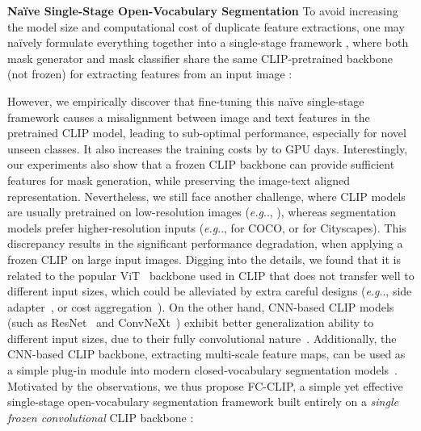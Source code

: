 \documentclass{article}
\makeatletter
\DeclareRobustCommand\onedot{\futurelet\@let@token\@onedot}
\def\@onedot{\ifx\@let@token.\else.\null\fi\xspace}
\def\eg{\emph{e.g}\onedot}
\newcommand{\modelname}{FC-CLIP\xspace}
\makeatother
\begin{document}
\noindent \textbf{Na\"ive Single-Stage Open-Vocabulary Segmentation}\quad
To avoid increasing the model size and computational cost of duplicate feature extractions, one may na\"ively formulate everything together into a single-stage framework , where both mask generator and mask classifier share the same CLIP-pretrained backbone  (not frozen) for extracting features from an input image :


However, we empirically discover that fine-tuning this na\"ive single-stage framework causes a misalignment between image and text features in the pretrained CLIP model, leading to sub-optimal performance, especially for novel unseen classes. It also increases the training costs by  to  GPU days.
Interestingly, our experiments also show that a frozen CLIP backbone can provide sufficient features for mask generation, while preserving the image-text aligned representation.
Nevertheless, we still face another challenge, where CLIP models are usually pretrained on low-resolution images (\eg, ), whereas segmentation models prefer higher-resolution inputs (\eg,  for COCO, or  for Cityscapes).
This discrepancy results in the significant performance degradation, when applying a frozen CLIP on large input images.
Digging into the details, we found that it is related to the popular ViT~\cite{dosovitskiy2020image} backbone used in CLIP that does not transfer well to different input sizes, which could be alleviated by extra careful designs (\eg, side adapter~\cite{chen2023vision,xu2023side}, or cost aggregation~\cite{zhou2022extract,cho2023cat}).
On the other hand, CNN-based CLIP models (such as ResNet~\cite{he2016deep} and ConvNeXt~\cite{liu2022convnet}) exhibit better generalization ability to different input sizes, due to their fully convolutional nature~\cite{long2014fully}.
Additionally, the CNN-based CLIP backbone, extracting multi-scale feature maps, can be used as a simple plug-in module into modern closed-vocabulary segmentation models~\cite{cheng2021masked,yu2022k}.
Motivated by the observations, we thus propose \modelname, a simple yet effective single-stage open-vocabulary segmentation framework built entirely on a \textit{single frozen convolutional} CLIP backbone :
\end{document}
